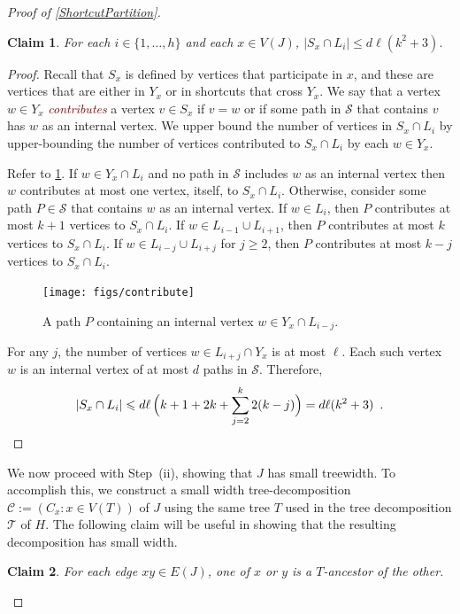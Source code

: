 \documentclass{patmorin}
\theoremstyle{plain}
\newtheorem{clm}{Claim}
\theoremstyle{definition}
\newcommand{\defin}[1]{\textcolor{Maroon}{\emph{#1}}}
\renewcommand{\SS}{\mathcal{S}}
\renewcommand{\ge}{\geqslant}
\renewcommand{\le}{\leqslant}
\begin{document}
\begin{proof}[Proof of \cref{ShortcutPartition}]
\begin{clm}
	\label{general-width}
  For each $i\in\{1,\ldots,h\}$ and each $x\in V(J)$, $|S_x\cap L_i|\le d\ell(k^2+3)$.
\end{clm}

\begin{proof}
  Recall that $S_x$ is defined by vertices that participate in $x$, and these are vertices that are either in $Y_x$ or in shortcuts that cross $Y_x$.  We say that a vertex $w\in Y_x$ \defin{contributes} a vertex $v\in S_x$ if $v=w$ or if some path in $\SS$ that contains $v$ has $w$ as an internal vertex.
  We upper bound the number of vertices in $S_x\cap L_i$ by upper-bounding the number of vertices contributed to $S_x\cap L_i$ by each $w\in Y_x$.

  Refer to \cref{contribute}.  If $w\in Y_x\cap L_i$ and no path in $\SS$ includes $w$ as an internal vertex then $w$ contributes at most one vertex, itself, to $S_x\cap L_i$.  Otherwise, consider some path $P\in\SS$ that contains $w$ as an internal vertex.  If $w\in L_{i}$, then $P$ contributes at most $k+1$ vertices to $S_x\cap L_i$.  If $w\in L_{i-1}\cup L_{i+1}$, then $P$ contributes at most $k$ vertices to $S_x\cap L_i$. If $w\in L_{i-j}\cup L_{i+j}$ for $j\ge 2$, then $P$ contributes at most $k-j$ vertices to $S_x\cap L_i$.

  \begin{figure}[htbp]
    \begin{center}
      \texttt{[image: figs/contribute]}
    \end{center}
    \caption{A path $P$ containing an internal vertex $w\in Y_x\cap L_{i-j}$.}
    \label{contribute}
  \end{figure}


  For any $j$, the number of vertices $w\in L_{i+j}\cap Y_x$ is at most $\ell$. Each such vertex $w$ is an internal vertex of at most $d$ paths in $\SS$. Therefore,
  \[  |S_x\cap L_i|\le d\ell  \, \Big(k+1 + 2k + \sum_{j=2}^k 2(k-j)\Big)
      = d\ell(k^2 +3) \enspace . \qedhere
  \]
\end{proof}

We now proceed with Step~(ii), showing that $J$ has small treewidth. To accomplish this, we construct a small width tree-decomposition $\mathcal{C}:=(C_x:x\in V(T))$ of $J$ using the same tree $T$ used in the tree decomposition $\mathcal{T}$ of $H$.  The following claim will be useful in showing that the resulting decomposition has small width.

\begin{clm}\label{i-ancestor}
  For each edge $xy\in E(J)$, one of $x$ or $y$ is a $T$-ancestor of the other.
\end{clm}


\end{proof}
\end{document}
